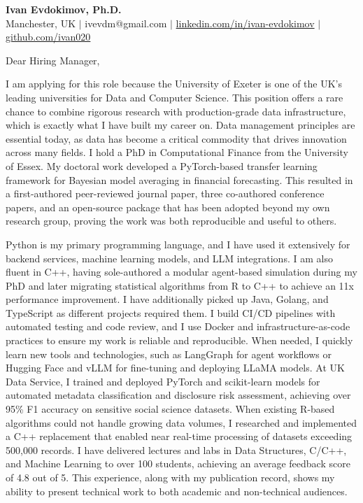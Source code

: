 \documentclass[11pt]{letter}
\begin{document}
\begin{center}
{\Large \textbf{Ivan Evdokimov, Ph.D.}}\\[4pt]
{\small Manchester, UK \; $|$ \; ivevdm@gmail.com \; $|$ \; \href{https://linkedin.com/in/ivan-evdokimov}{linkedin.com/in/ivan-evdokimov} \; $|$ \; \href{https://github.com/ivan020}{github.com/ivan020}}
\end{center}

\vspace{10pt}

Dear Hiring Manager,

I am applying for this role because the University of Exeter is one of the UK’s leading universities for Data and Computer Science. This position offers a rare chance to combine rigorous research with production-grade data infrastructure, which is exactly what I have built my career on. Data management principles are essential today, as data has become a critical commodity that drives innovation across many fields.
I hold a PhD in Computational Finance from the University of Essex. My doctoral work developed a PyTorch-based transfer learning framework for Bayesian model averaging in financial forecasting. This resulted in a first-authored peer-reviewed journal paper, three co-authored conference papers, and an open-source package that has been adopted beyond my own research group, proving the work was both reproducible and useful to others.

Python is my primary programming language, and I have used it extensively for backend services, machine learning models, and LLM integrations. I am also fluent in C++, having sole-authored a modular agent-based simulation during my PhD and later migrating statistical algorithms from R to C++ to achieve an 11x performance improvement. I have additionally picked up Java, Golang, and TypeScript as different projects required them. I build CI/CD pipelines with automated testing and code review, and I use Docker and infrastructure-as-code practices to ensure my work is reliable and reproducible. When needed, I quickly learn new tools and technologies, such as LangGraph for agent workflows or Hugging Face and vLLM for fine-tuning and deploying LLaMA models.
At UK Data Service, I trained and deployed PyTorch and scikit-learn models for automated metadata classification and disclosure risk assessment, achieving over 95\% F1 accuracy on sensitive social science datasets. When existing R-based algorithms could not handle growing data volumes, I researched and implemented a C++ replacement that enabled near real-time processing of datasets exceeding 500,000 records. I have delivered lectures and labs in Data Structures, C/C++, and Machine Learning to over 100 students, achieving an average feedback score of 4.8 out of 5. This experience, along with my publication record, shows my ability to present technical work to both academic and non-technical audiences.
\end{document}
